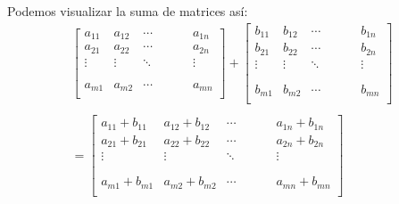 \documentclass[handout]{beamer} %
\renewcommand{\_}[1]{_{\left[ #1 \right]}}
\renewcommand{\^}[1]{^{\left[ #1 \right]}}
\begin{document}
\begin{frame}
    Podemos visualizar la suma de matrices así:
    \begin{align*}
        \left[
        \begin{array}{ccccccc}
            a_{11} & a_{12} & \cdots & & &  & a_{1n}\\ 
            a_{21} & a_{22} & \cdots & & &  & a_{2n}\\
            \vdots & \vdots & \ddots & & &  & \vdots\\
            & &  & & &  \\
            & &  & & &  \\
            a_{m1} & a_{m2} & \cdots & & & & a_{mn}\\ 
        \end{array}
        \right] 
        +
        \left[
        \begin{array}{ccccccc}
            b_{11} & b_{12} & \cdots & & &  & b_{1n}\\ 
            b_{21} & b_{22} & \cdots & & &  & b_{2n}\\
            \vdots & \vdots & \ddots & & &  & \vdots\\
            & &  & & &  \\
            & &  & & &  \\
            b_{m1} & b_{m2} & \cdots & & & & b_{mn}\\ 
        \end{array}
        \right]
        \\
        \\
        =
        \left[
        \begin{array}{ccccccc}
            a_{11}+b_{11} & a_{12}+b_{12} & \cdots & & &  & a_{1n}+b_{1n}\\ 
            a_{21}+b_{21} & a_{22}+b_{22} & \cdots & & &  & a_{2n}+b_{2n}\\
            \vdots & \vdots & \ddots & & &  & \vdots\\
            & &  & & &  \\
            & &  & & &  \\
            a_{m1}+b_{m1} & a_{m2}+b_{m2} & \cdots & & & & a_{mn}+b_{mn}\\ 
        \end{array}
        \right]
    \end{align*}
\end{frame}
\end{document}
